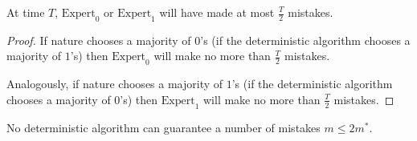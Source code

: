     \begin{claim}
        At time $T$, $\text{Expert}_0$ or $\text{Expert}_1$ will have made at most $\frac{T}{2}$ mistakes.
    \end{claim}

    \begin{proof}
        If nature chooses a majority of $0$'s (if the deterministic algorithm chooses a majority of $1$'s) then $\text{Expert}_0$ will make no more than $\frac{T}{2}$ mistakes.

        Analogously, if nature chooses a majority of $1$'s (if the deterministic algorithm chooses a majority of $0$'s) then $\text{Expert}_1$ will make no more than $\frac{T}{2}$ mistakes.
    \end{proof}

    \begin{corollary}
        No deterministic algorithm can guarantee a number of mistakes $m \leq 2 m^*$.
    \end{corollary}